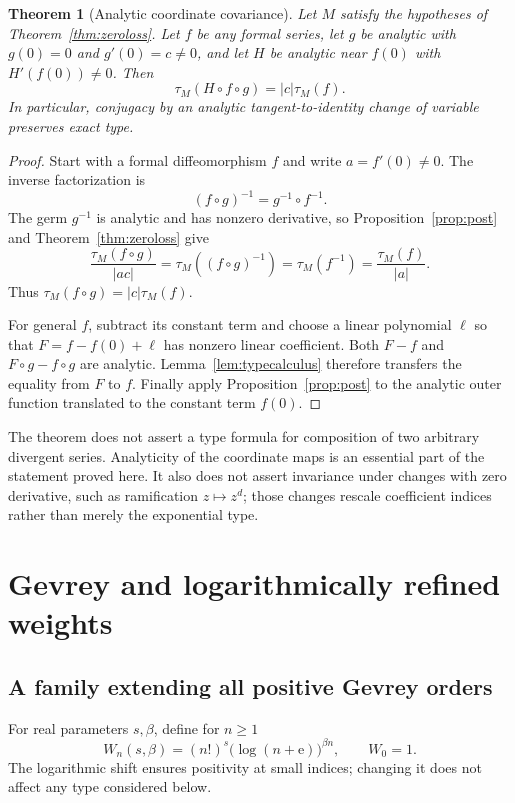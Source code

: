 \documentclass[11pt,a4paper]{article}
\numberwithin{equation}{section}
\newtheorem{theorem}{Theorem}[section]
\theoremstyle{definition}
\theoremstyle{remark}
\newcommand{\typ}{\tau_M}
\newcommand{\ee}{\mathrm e}
\begin{document}
\begin{theorem}[Analytic coordinate covariance]
\label{thm:coordinates}
Let $M$ satisfy the hypotheses of Theorem~\ref{thm:zeroloss}.
Let $f$ be any formal series, let $g$ be analytic with $g(0)=0$ and
$g'(0)=c\ne0$, and let $H$ be analytic near $f(0)$ with
$H'(f(0))\ne0$. Then
\begin{equation}
 \boxed{\displaystyle
 \typ(H\circ f\circ g)=|c|\typ(f).}
 \label{eq:coordinates}
\end{equation}
In particular, conjugacy by an analytic tangent-to-identity change of
variable preserves exact type.
\end{theorem}
\begin{proof}
Start with a formal diffeomorphism $f$ and write $a=f'(0)\ne0$.
The inverse factorization is
\[
 (f\circ g)^{-1}=g^{-1}\circ f^{-1}.
\]
The germ $g^{-1}$ is analytic and has nonzero derivative, so
Proposition~\ref{prop:post} and Theorem~\ref{thm:zeroloss} give
\[
 \frac{\typ(f\circ g)}{|ac|}
 =\typ((f\circ g)^{-1})
 =\typ(f^{-1})
 =\frac{\typ(f)}{|a|}.
\]
Thus $\typ(f\circ g)=|c|\typ(f)$.

For general $f$, subtract its constant term and choose a linear
polynomial $\ell$ so that $F=f-f(0)+\ell$ has nonzero linear
coefficient. Both $F-f$ and $F\circ g-f\circ g$ are analytic.
Lemma~\ref{lem:typecalculus} therefore transfers the equality from $F$
to $f$. Finally apply Proposition~\ref{prop:post} to the analytic outer
function translated to the constant term $f(0)$.
\end{proof}

The theorem does not assert a type formula for composition of two
arbitrary divergent series. Analyticity of the coordinate maps is an
essential part of the statement proved here. It also does not assert
invariance under changes with zero derivative, such as ramification
$z\mapsto z^d$; those changes rescale coefficient indices rather than
merely the exponential type.

\section{Gevrey and logarithmically refined weights}
\label{sec:weightspecial}

\subsection{A family extending all positive Gevrey orders}

For real parameters $s,\beta$, define for $n\ge1$
\begin{equation}
 W_n(s,\beta)=(n!)^s\bigl(\log(n+\ee)\bigr)^{\beta n},
 \qquad W_0=1.
 \label{eq:logweight}
\end{equation}
The logarithmic shift ensures positivity at small indices; changing it
does not affect any type considered below.
\end{document}
